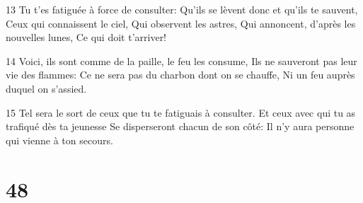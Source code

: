 \par 13 Tu t'es fatiguée à force de consulter: Qu'ils se lèvent donc et qu'ils te sauvent, Ceux qui connaissent le ciel, Qui observent les astres, Qui annoncent, d'après les nouvelles lunes, Ce qui doit t'arriver!
\par 14 Voici, ils sont comme de la paille, le feu les consume, Ils ne sauveront pas leur vie des flammes: Ce ne sera pas du charbon dont on se chauffe, Ni un feu auprès duquel on s'assied.
\par 15 Tel sera le sort de ceux que tu te fatiguais à consulter. Et ceux avec qui tu as trafiqué dès ta jeunesse Se disperseront chacun de son côté: Il n'y aura personne qui vienne à ton secours.

\chapter{48}

